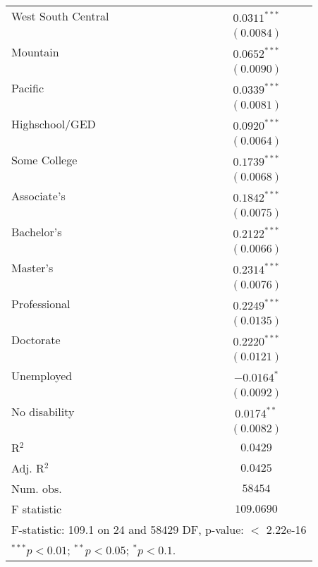 \documentclass{article}
\begin{document}
\begin{table}
\begin{center}
\begin{tabular}{l c}
West South Central             & $0.0311^{***}$  \\
                               & $(0.0084)$      \\
Mountain                       & $0.0652^{***}$  \\
                               & $(0.0090)$      \\
Pacific                        & $0.0339^{***}$  \\
                               & $(0.0081)$      \\
Highschool/GED                 & $0.0920^{***}$  \\
                               & $(0.0064)$      \\
Some College                   & $0.1739^{***}$  \\
                               & $(0.0068)$      \\
Associate's                    & $0.1842^{***}$  \\
                               & $(0.0075)$      \\
Bachelor's                     & $0.2122^{***}$  \\
                               & $(0.0066)$      \\
Master's                       & $0.2314^{***}$  \\
                               & $(0.0076)$      \\
Professional                   & $0.2249^{***}$  \\
                               & $(0.0135)$      \\
Doctorate                      & $0.2220^{***}$  \\
                               & $(0.0121)$      \\
Unemployed                     & $-0.0164^{*}$   \\
                               & $(0.0092)$      \\
No disability                  & $0.0174^{**}$   \\
                               & $(0.0082)$      \\
\hline
R$^2$                          & $0.0429$        \\
Adj. R$^2$                     & $0.0425$        \\
Num. obs.                      & $58454$         \\
F statistic                    & $109.0690$      \\
\hline
\multicolumn{2}{l}{\scriptsize{F-statistic: 109.1 on 24 and 58429 DF, p-value: $<$ 2.22e-16}}\\
\multicolumn{2}{l}{\scriptsize{$^{***}p<0.01$; $^{**}p<0.05$; $^{*}p<0.1$.}}
\end{tabular}
\end{center}
\end{table}
\end{document}
